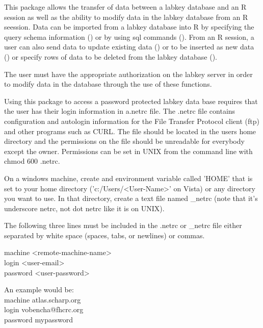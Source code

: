 \documentclass{article}
\begin{document}
\begin{Description}\relax
This package allows the transfer of data between a labkey database and an R session as well as the
ability to modify data in the labkey database from an R seession. Data can be imported from 
a labkey database into R by specifying the query schema information () 
or by using sql commands (). From an R session,
a user can also send data to update existing data () or to be inserted as new data 
() or specify rows of data to be deleted from the labkey database (). 

The user must have the appropriate authorization on the labkey
server in order to modify data in the database through the use of
these functions.
\end{Description}
\begin{Details}\relax
{}
Using this package to access a password protected labkey data base requires that the user
has their login information in a.netrc file. The .netrc file
contains configuration and autologin information for the File Transfer Protocol client (ftp) and
other programs such as CURL.
The file should be located in the users home directory and the permissions on the file should be unreadable for 
everybody except the owner. Permissions can be set in UNIX from the command line with chmod 600 .netrc.  

On a windows machine, create and  environment variable called 'HOME' that is set to your home directory ('c:/Users/<User-Name>' on Vista) or any directory you want to use. In that directory, create a text file named \_netrc (note that it's underscore netrc, not dot netrc like it is on UNIX). 

The following three lines must be included in the .netrc or \_netrc file either separated by white space
(spaces, tabs, or newlines) or commas.

machine <remote-machine-name>\\
login <user-email>\\
password <user-password>


An example would be:\\
machine atlas.scharp.org\\
login vobencha@fhcrc.org\\
password mypassword\\
\end{Details}
\end{document}
